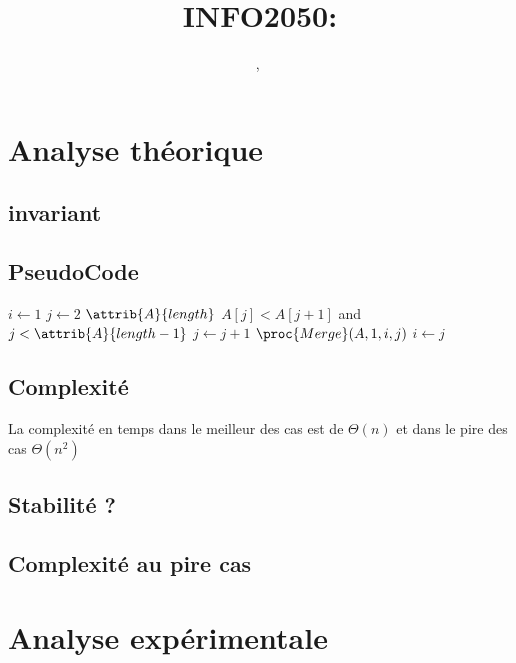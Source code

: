 \documentclass[a4paper, 11pt, oneside]{article}
\title{INFO2050: \intitule}
\author{\PrenomUN~\textsc{\NomUN}, \PrenomDEUX~\textsc{\NomDEUX}}
\date{}
\newcommand{\tablemat}{~}
\renewcommand{\tablemat}{\tableofcontents}
\begin{document}
\maketitle
\newpage
\tablemat
\newpage


	\section{Analyse théorique}
	\subsection{invariant}
	\newpage
	
	\subsection{PseudoCode}
	
	\begin{codebox}
\li $i \gets 1$
\li \For $j \gets 2$ \To $\attrib{A}{length}$
\Do
\li \While $A[j] < A[j+1]$ and $j < \attrib{A}{length -1}$
\li \Do
$j \gets j + 1$
\End
\li $\proc{Merge}(A, 1, i, j)$
\End
\li $i \gets j$
\End
\end{codebox}

\subsection{Complexité}
La complexité en temps dans le meilleur des cas est de $\Theta(n)$ et dans le pire des cas $\Theta(n^{2})$ 

\newpage
\subsection{Stabilité ?}
\newpage
\subsection{Complexité au pire cas}
\newpage

\section{Analyse expérimentale}
\end{document}

